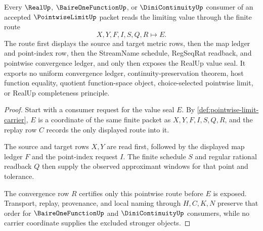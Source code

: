 \begin{theorem}
\label{thm:pointwise-limit-real-seal-handoff}
Every $\RealUp$, $\BaireOneFunctionUp$, or $\DiniContinuityUp$ consumer of an accepted $\PointwiseLimitUp$ packet reads the limiting value through the finite route
$$
X,Y,F,I,S,Q,R \longmapsto E.
$$
The route first displays the source and target metric rows, then the map ledger and point-index row, then the StreamName schedule, RegSeqRat readback, and pointwise convergence ledger, and only then exposes the RealUp value seal. It exports no uniform convergence ledger, continuity-preservation theorem, host function equality, quotient function-space object, choice-selected pointwise limit, or RealUp completeness principle.
\end{theorem}
\begin{proof}
Start with a consumer request for the value seal $E$. By \autoref{def:pointwise-limit-carrier}, $E$ is a coordinate of the same finite packet as $X,Y,F,I,S,Q,R$, and the replay row $C$ records the only displayed route into it.

The source and target rows $X,Y$ are read first, followed by the displayed map ledger $F$ and the point-index request $I$. The finite schedule $S$ and regular rational readback $Q$ then supply the observed approximant windows for that point and tolerance.

The convergence row $R$ certifies only this pointwise route before $E$ is exposed. Transport, replay, provenance, and local naming through $H,C,K,N$ preserve that order for $\BaireOneFunctionUp$ and $\DiniContinuityUp$ consumers, while no carrier coordinate supplies the excluded stronger objects.
\end{proof}




